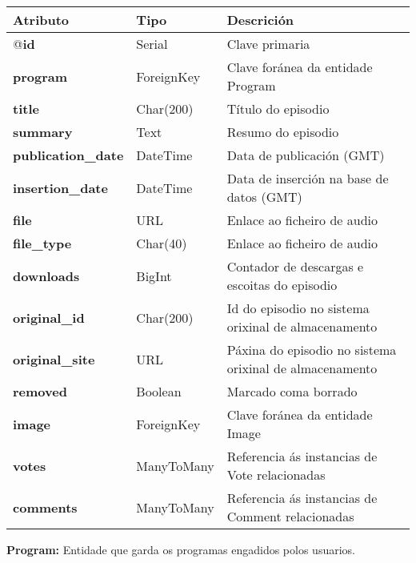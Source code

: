 \begin{longtable}{|p{3cm}|p{3cm}|p{8cm}|} 
	\hline
	\rowcolor{gray!50}
	Atributo & Tipo & Descrición\\
	\hline
	@\textbf{id} & Serial & Clave primaria\\
	\hline
	\textbf{program} & ForeignKey & Clave foránea da entidade Program\\
	\hline
	\textbf{title} & Char(200) & Título do episodio\\	
	\hline
	\textbf{summary} & Text & Resumo do episodio\\
	\hline
	\textbf{publication\_date} & DateTime & Data de publicación (GMT)\\
	\hline
	\textbf{insertion\_date} & DateTime & Data de inserción na base de datos (GMT)\\
	\hline
	\textbf{file} & URL & Enlace ao ficheiro de audio\\
	\hline
	\textbf{file\_type} & Char(40) & Enlace ao ficheiro de audio\\
	\hline
	\textbf{downloads} & BigInt & Contador de descargas e escoitas do episodio\\
	\hline
	\textbf{original\_id} & Char(200) & Id do episodio no sistema orixinal de almacenamento\\
	\hline
	\textbf{original\_site} & URL & Páxina do episodio no sistema orixinal de almacenamento\\
	\hline
	\textbf{removed} & Boolean & Marcado coma borrado\\
	\hline
	\textbf{image} & ForeignKey & Clave foránea da entidade Image\\
	\hline
	\textbf{votes} & ManyToMany & Referencia ás instancias de Vote relacionadas\\
	\hline
	\textbf{comments} & ManyToMany & Referencia ás instancias de Comment relacionadas\\
	\hline
	
\end{longtable}


\textbf{Program:} Entidade que garda os programas engadidos polos usuarios.

